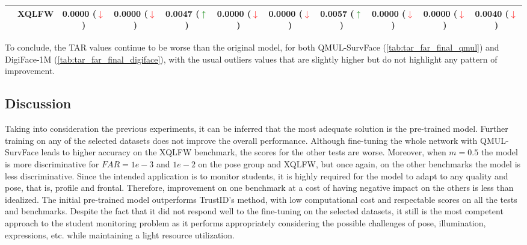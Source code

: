 \documentclass[class=report, crop=false, a4paper, 12pt]{standalone}
\begin{document}
\begin{table}[H]
{\begin{tabular}{cl|ccc|ccc|ccc|}
    \multicolumn{1}{|c|}{}                         & XQLFW    & \multicolumn{1}{c|}{0.0000 (\textcolor{red}{$\downarrow$})} & \multicolumn{1}{c|}{0.0000 (\textcolor{red}{$\downarrow$})} & 0.0047 (\textcolor{green}{$\uparrow$})   & \multicolumn{1}{c|}{0.0000 (\textcolor{red}{$\downarrow$})} & \multicolumn{1}{c|}{0.0000 (\textcolor{red}{$\downarrow$})} & 0.0057 (\textcolor{green}{$\uparrow$})   & \multicolumn{1}{c|}{0.0000 (\textcolor{red}{$\downarrow$})} & \multicolumn{1}{c|}{0.0000 (\textcolor{red}{$\downarrow$})} & 0.0040 (\textcolor{red}{$\downarrow$}) \\ \hline
    \end{tabular}%
    }
\end{table}

\par To conclude, the TAR values continue to be worse than the original model, for both QMUL-SurvFace (\autoref{tab:tar_far_final_qmul}) and DigiFace-1M (\autoref{tab:tar_far_final_digiface}), with the usual outliers values that are slightly higher but do not highlight any pattern of improvement.

\subsection{Discussion}
\par Taking into consideration the previous experiments, it can be inferred that the most adequate solution is the pre-trained model. Further training on any of the selected datasets does not improve the overall performance. Although fine-tuning the whole network with QMUL-SurvFace leads to higher accuracy on the XQLFW benchmark, the scores for the other tests are worse. Moreover, when $m=0.5$ the model is more discriminative for $FAR=1e-3$ and $1e-2$ on the pose group and XQLFW, but once again, on the other benchmarks the model is less discriminative. Since the intended application is to monitor students, it is highly required for the model to adapt to any quality and pose, that is, profile and frontal. Therefore, improvement on one benchmark at a cost of having negative impact on the others is less than idealized. The initial pre-trained model outperforms TrustID's method, with low computational cost and respectable scores on all the tests and benchmarks. Despite the fact that it did not respond well to the fine-tuning on the selected datasets, it still is the most competent approach to the student monitoring problem as it performs appropriately considering the possible challenges of pose, illumination, expressions, etc. while maintaining a light resource utilization. 
\end{document}
